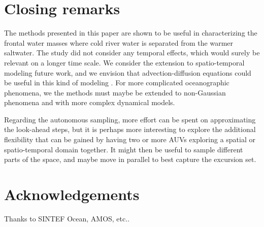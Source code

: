 \documentclass[aoas]{imsart}
\begin{document}


\section{Closing remarks}\label{sec:concl_disc}

The methods presented in this paper are shown to be useful in characterizing the frontal water masses where cold river water is separated from the warmer saltwater. The study did not consider any temporal effects, which would surely be relevant on a longer time scale. We consider the extension to spatio-temporal modeling future work, and we envision that advection-diffusion equations could be useful in this kind of modeling \cite{sigrist2015stochastic}. 
For more complicated oceanographic phenomena, we the methods must maybe be extended to non-Gaussian phenomena and with more complex dynamical models. 

Regarding the autonomous sampling, more effort can be spent on approximating the look-ahead steps, but it is perhaps more interesting to explore the additional flexibility that can be gained by having two or more AUVs exploring a spatial or spatio-temporal domain together. It might then be useful to sample different parts of the space, and maybe move in parallel to best capture the excursion set. 

\section*{Acknowledgements}
Thanks to SINTEF Ocean, AMOS, etc..


\footnotesize




\end{document}
